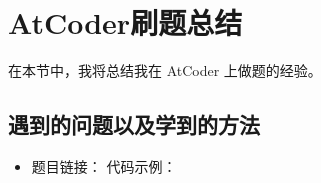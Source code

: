 \section{AtCoder刷题总结}
在本节中，我将总结我在 AtCoder 上做题的经验。

\subsection{遇到的问题以及学到的方法}
\begin{itemize}
\subsection{}
\item 题目链接：\href{}{}
代码示例：\\
\begin{lstlisting}[language=C++]

\end{lstlisting}
\end{itemize}
\newpage